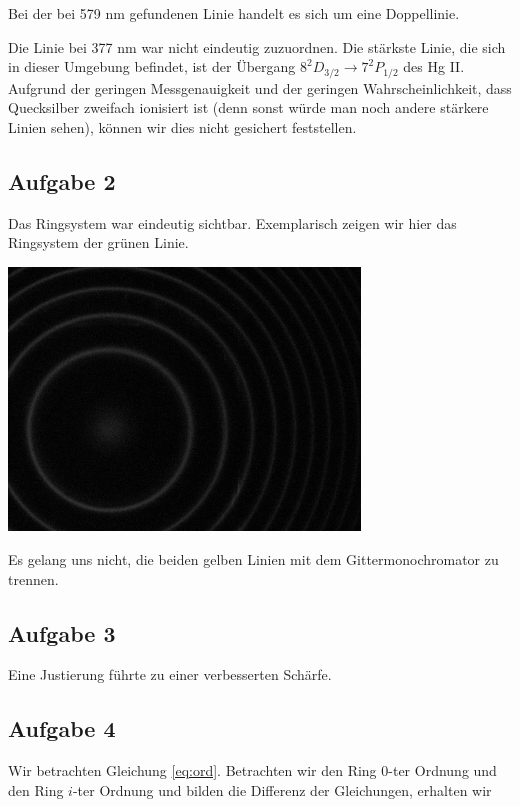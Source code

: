 \documentclass[a4paper,german,12pt,smallheadings]{scrartcl}
\begin{document}
Bei der bei 579 nm gefundenen Linie handelt es sich um eine Doppellinie.

Die Linie bei 377 nm war nicht eindeutig zuzuordnen. Die stärkste Linie, die
sich in dieser Umgebung befindet, ist der Übergang $8^2D_{3/2} \to 7^2P_{1/2}$
des Hg II. Aufgrund der geringen Messgenauigkeit und der geringen
Wahrscheinlichkeit, dass Quecksilber zweifach ionisiert ist (denn sonst würde
man noch andere stärkere Linien sehen), können wir dies nicht gesichert
feststellen.

\subsection{Aufgabe 2}

Das Ringsystem war eindeutig sichtbar. Exemplarisch zeigen wir hier das
Ringsystem der grünen Linie.

\vspace{22pt}

\includegraphics[width=0.7\textwidth]{justiert.png}

Es gelang uns nicht, die beiden gelben Linien mit dem Gittermonochromator zu
trennen.

\subsection{Aufgabe 3}

Eine Justierung führte zu einer verbesserten Schärfe.

\subsection{Aufgabe 4}

Wir betrachten Gleichung \ref{eq:ord}. Betrachten wir den Ring $0$-ter Ordnung
und den Ring $i$-ter Ordnung und bilden die Differenz der Gleichungen, erhalten
wir
\end{document}
